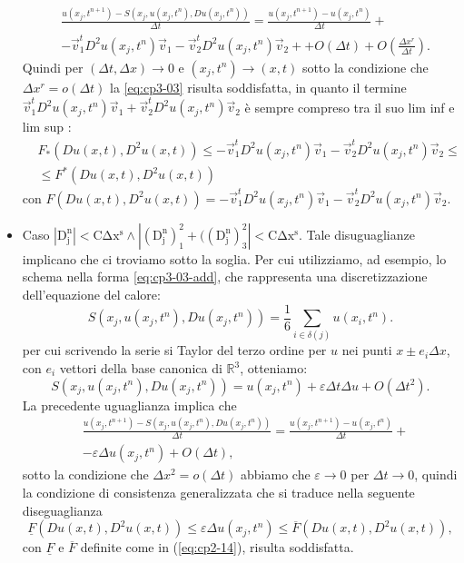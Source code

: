 \begin{itemize}
\[\begin{split}
  &\frac{u(x_j,t^{n+1})-S(x_j,u(x_j,t^n),Du(x_j,t^n))}{\Delta t}= \frac{u(x_j,t^{n+1})-u(x_j,t^n)}{\Delta t} + \\
  &  -\vec{v}_1^tD^2u(x_j,t^n)\vec{v}_1 -\vec{v}_2^tD^2u(x_j,t^n)\vec{v}_2 + 
   + O(\Delta t) + O(\frac{\Delta x^r}{\Delta t}).
\end{split}
\]
Quindi per  $(\Delta t,\Delta x)\to 0$ e $(x_j,t^n)\to(x,t)$ sotto la condizione che $\Delta x^r = o(\Delta t)$ la \eqref{eq:cp3-03} risulta soddisfatta, in quanto il termine $\vec{v}_1^tD^2u(x_j,t^n)\vec{v}_1 +\vec{v}_2^tD^2u(x_j,t^n)\vec{v}_2 $ è sempre compreso tra il suo lim inf e lim sup :
\[
\begin{split}
  &F_*(Du(x,t),D^2u(x,t))\le-\vec{v}_1^tD^2u(x_j,t^n)\vec{v}_1
  -\vec{v}_2^tD^2u(x_j,t^n)\vec{v}_2\le \\
  &\le F^*(Du(x,t),D^2u(x,t))
\end{split}
\]
con $F(Du(x,t),D^2u(x,t))=-\vec{v}_1^tD^2u(x_j,t^n)\vec{v}_1 -\vec{v}_2^tD^2u(x_j,t^n)\vec{v}_2$.
  \item \textsf{Caso} $\mathrm{|D_j^n|< C\Delta x^s\land |(D_j^n)_1^2+((D_j^n)_3^2|< C\Delta x^s}$. Tale disuguaglianze implicano che ci troviamo sotto la soglia. Per cui utilizziamo, ad esempio, lo schema nella forma \eqref{eq:cp3-03-add}, che rappresenta una discretizzazione dell'equazione del calore:
\[
S(x_j,u(x_j,t^n),Du(x_j,t^n))=\frac{1}{6}\sum_{i\in\delta(j)}u(x_i,t^n).
\]
per cui scrivendo la serie si Taylor del terzo ordine per $u$ nei punti $x\pm e_i\Delta x$, con $e_i$ vettori della base canonica di $\mathbb{R}^3$, otteniamo:
\[
S(x_j,u(x_j,t^n),Du(x_j,t^n))=u(x_j,t^n) + \varepsilon\Delta t\Delta u + O(\Delta t^2).
\]
La precedente uguaglianza implica che
\[
\begin{split}
  &\frac{u(x_j,t^{n+1})-S(x_j,u(x_j,t^n),Du(x_j,t^n))}{\Delta t}= \frac{u(x_j,t^{n+1})-u(x_j,t^n)}{\Delta t} + \\
  &  -\varepsilon\Delta u(x_j,t^n) + O(\Delta t),
\end{split}
\]
sotto la condizione che $\Delta x^2=o(\Delta t)$ abbiamo che $\varepsilon\to 0$ per $\Delta t\to 0$, quindi la condizione di consistenza generalizzata che si traduce nella seguente diseguaglianza
\[
\underline{F}(Du(x,t),D^2u(x,t))\le\varepsilon\Delta u(x_j,t^n)\le \overline{F}(Du(x,t),D^2u(x,t)),
\]
con $\underline{F}$ e $\overline{F}$ definite come in (\hyperref[eq:cp2-14]{\ref{eq:cp2-14}}), risulta soddisfatta.  
\end{itemize}
%
